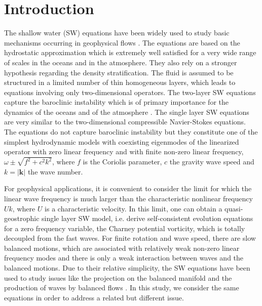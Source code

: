 \documentclass{jfm}
\newcommand{\kk}{\textbf{k}}
\begin{document}
\section{Introduction}

The shallow water (SW) equations  have been widely used to study basic
mechanisms occurring in geophysical flows \cite[see for
example][]{VallisLIVRE2006}.
%
The equations are based on the hydrostatic approximation which is
extremely well satisfied for a very wide range of scales in the oceans
and in the atmosphere.  They also rely on a stronger hypothesis
regarding the density stratification.  The fluid is assumed to be
structured in a limited number of thin homogeneous layers, which leads
to equations involving only two-dimensional operators. The two-layer
SW equations capture the baroclinic instability which is of
primary importance for the dynamics of the oceans and of the
atmosphere \cite[]{VallisLIVRE2006, Wirth2013}.
%
The single layer SW equations are very similar to
the two-dimensional compressible Navier-Stokes equations.  The
equations do not capture baroclinic instability but they constitute
one of the simplest hydrodynamic models with coexisting eigenmodes of
the linearized operator with zero linear frequency and with finite
non-zero linear frequency, $\omega  \pm\sqrt{f^2 + c^2
k^2}$, where $f$ is the Coriolis parameter, $c$ the gravity wave speed and $k
= |\kk|$ the wave number.
%

For geophysical applications, it is convenient to consider the limit
for which the linear wave frequency  is much larger than the
characteristic nonlinear frequency $ U k$, where $U$ is a
characteristic velocity.  In this limit, one can obtain a quasi-geostrophic
single layer SW model, i.e. derive self-consistent evolution
equations for a zero frequency variable, the Charney potential
vorticity, which is totally decoupled from the fast waves.
%
For finite rotation and wave speed, there are slow balanced motions,
which are associated with relatively weak non-zero linear frequency
modes and there is only a weak
interaction between waves and the balanced motions.
%
Due to their relative simplicity, the SW equations have
been used to study issues like the projection on the balanced manifold
\cite[]{Lorenz1980, MohebalhojehDritschel2000} and the production of
waves by balanced flows \cite[]{FargeSadourny1989,
LahayeZeitlin2012,Vanneste2013}.
In this study, we consider the
same equations in order to address a related but different issue.
\end{document}
